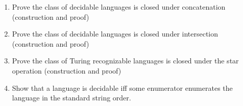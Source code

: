 \documentclass{article}
\begin{document}
\begin{enumerate}
\begin{proof}
            Let $M_1$ and $M_2$ be two Turing machines that recognize languages $L_1$ and $L_2$
            respectfully. Then let $M_3$ be a machine that will run input $w$ alternately between 
            machines $M_1$ and $M_2$. If a machine accepts, $M_3$ accepts. If both 
            machines reject then $M_3$ rejects. As $w\in L_1\cup L_2$, the string can be $w\in L_1$,
            then the $M_1$ portions of $M_3$ will accept it. If the string is $w\in L_2$, then the
            $M_2$ portions of $M_3$ will accept it. If the string is $w\not\in L_1\cup L_2$ then 
            $w\not\in L_1$ and $w\not\in L_2$ and so $M_3$ will not accept $w$. Therefore $M_3$ 
            recognizes $L_1\cup L_2$.
        \end{proof}
        \item Prove the class of decidable languages is closed under concatenation (construction 
        and proof)
        \item Prove the class of decidable languages is closed under intersection (construction 
        and proof)
        \item Prove the class of Turing recognizable languages is closed under the star operation 
        (construction and proof)
        \item Show that a language is decidable iff some enumerator enumerates the language in
        the standard string order.
    \end{enumerate}
\end{document}

